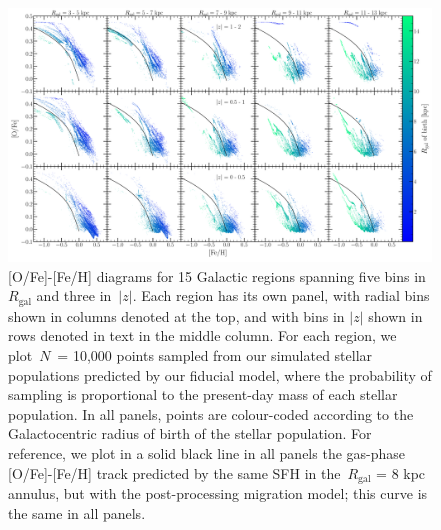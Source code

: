 \begin{figure} 
\centering 
\includegraphics[scale = 0.28]{ofe_feh_densitymap.pdf} 
\caption{[O/Fe]-[Fe/H] diagrams for 15 Galactic regions spanning five bins in 
$R_\text{gal}$ and three in~$\left|z\right|$. Each region has its own panel, 
with radial bins shown in columns denoted at the top, and with bins in 
$\left|z\right|$ shown in rows denoted in text in the middle column. For each 
region, we plot~$N$~= 10,000 points sampled from our simulated stellar 
populations predicted by our fiducial model, where the probability of 
sampling is proportional to the present-day mass of each stellar population. 
In all panels, points are colour-coded according to the Galactocentric radius 
of birth of the stellar population. For reference, we plot in a solid black 
line in all panels the gas-phase [O/Fe]-[Fe/H] track predicted by the same 
SFH in the~$R_\text{gal}$ = 8 kpc annulus, but with the post-processing 
migration model; this curve is the same in all panels. } 
\label{migration:fig:ofe_feh_diagram} 
\end{figure} 

